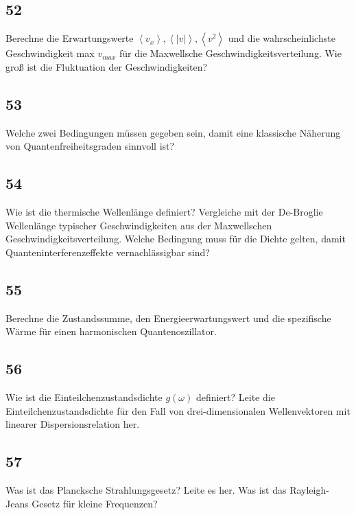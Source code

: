 \documentclass[12pt,a4paper]{report}
\newenvironment{myfrag}{\begin{it}}{\end{it}\vspace{3mm}\par}
\numberwithin{equation}{section}
\begin{document}
\subsection{52}
\begin{myfrag}
Berechne die Erwartungswerte $\left\langle v_x \right\rangle , \left\langle |v| \right\rangle , \left\langle v^2 \right\rangle $ und die wahrscheinlichste
Geschwindigkeit max $v_{max}$ für die Maxwellsche Geschwindigkeitsverteilung. Wie
groß ist die Fluktuation der Geschwindigkeiten?
\end{myfrag}
\subsection{53}
\begin{myfrag}
Welche zwei Bedingungen müssen gegeben sein, damit eine klassische
Näherung von Quantenfreiheitsgraden sinnvoll ist?
\end{myfrag}
\subsection{54}
\begin{myfrag}
Wie ist die thermische Wellenlänge definiert? Vergleiche mit der De-Broglie
Wellenlänge typischer Geschwindigkeiten aus der Maxwellschen
Geschwindigkeitsverteilung. Welche Bedingung muss für die Dichte gelten,
damit Quanteninterferenzeffekte vernachlässigbar sind?
\end{myfrag}
\subsection{55}
\begin{myfrag}
Berechne die Zustandssumme, den Energieerwartungswert und die
spezifische Wärme für einen harmonischen Quantenoszillator.
\end{myfrag}
\subsection{56}
\begin{myfrag}
Wie ist die Einteilchenzustandsdichte $g(\omega )$ definiert? Leite die
Einteilchenzustandsdichte für den Fall von drei-dimensionalen
Wellenvektoren mit linearer Dispersionsrelation her.
\end{myfrag}
\subsection{57}
\begin{myfrag}
Was ist das Plancksche Strahlungsgesetz? Leite es her. Was ist das
Rayleigh-Jeans Gesetz für kleine Frequenzen?
\end{myfrag}
\end{document}
